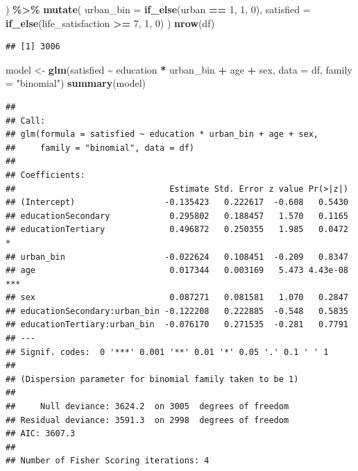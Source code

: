 \documentclass[
]{article}
\newenvironment{Shaded}{\begin{snugshade}}{\end{snugshade}}
\newcommand{\AttributeTok}[1]{\textcolor[rgb]{0.13,0.29,0.53}{#1}}
\newcommand{\DecValTok}[1]{\textcolor[rgb]{0.00,0.00,0.81}{#1}}
\newcommand{\FunctionTok}[1]{\textcolor[rgb]{0.13,0.29,0.53}{\textbf{#1}}}
\newcommand{\NormalTok}[1]{#1}
\newcommand{\OtherTok}[1]{\textcolor[rgb]{0.56,0.35,0.01}{#1}}
\newcommand{\SpecialCharTok}[1]{\textcolor[rgb]{0.81,0.36,0.00}{\textbf{#1}}}
\newcommand{\StringTok}[1]{\textcolor[rgb]{0.31,0.60,0.02}{#1}}
\begin{document}
\begin{Shaded}
\begin{Highlighting}[]
\NormalTok{  ) }\SpecialCharTok{\%\textgreater{}\%}
  \FunctionTok{mutate}\NormalTok{(}
    \AttributeTok{urban\_bin =} \FunctionTok{if\_else}\NormalTok{(urban }\SpecialCharTok{==} \DecValTok{1}\NormalTok{, }\DecValTok{1}\NormalTok{, }\DecValTok{0}\NormalTok{),}
    \AttributeTok{satisfied =} \FunctionTok{if\_else}\NormalTok{(life\_satisfaction }\SpecialCharTok{\textgreater{}=} \DecValTok{7}\NormalTok{, }\DecValTok{1}\NormalTok{, }\DecValTok{0}\NormalTok{)}
\NormalTok{  )}
\FunctionTok{nrow}\NormalTok{(df)}
\end{Highlighting}
\end{Shaded}

\begin{verbatim}
## [1] 3006
\end{verbatim}

\begin{Shaded}
\begin{Highlighting}[]
\NormalTok{model }\OtherTok{\textless{}{-}} \FunctionTok{glm}\NormalTok{(satisfied }\SpecialCharTok{\textasciitilde{}}\NormalTok{ education }\SpecialCharTok{*}\NormalTok{ urban\_bin }\SpecialCharTok{+}\NormalTok{ age }\SpecialCharTok{+}\NormalTok{ sex, }\AttributeTok{data =}\NormalTok{ df, }\AttributeTok{family =} \StringTok{"binomial"}\NormalTok{)}
\FunctionTok{summary}\NormalTok{(model)}
\end{Highlighting}
\end{Shaded}

\begin{verbatim}
## 
## Call:
## glm(formula = satisfied ~ education * urban_bin + age + sex, 
##     family = "binomial", data = df)
## 
## Coefficients:
##                               Estimate Std. Error z value Pr(>|z|)    
## (Intercept)                  -0.135423   0.222617  -0.608   0.5430    
## educationSecondary            0.295802   0.188457   1.570   0.1165    
## educationTertiary             0.496872   0.250355   1.985   0.0472 *  
## urban_bin                    -0.022624   0.108451  -0.209   0.8347    
## age                           0.017344   0.003169   5.473 4.43e-08 ***
## sex                           0.087271   0.081581   1.070   0.2847    
## educationSecondary:urban_bin -0.122208   0.222885  -0.548   0.5835    
## educationTertiary:urban_bin  -0.076170   0.271535  -0.281   0.7791    
## ---
## Signif. codes:  0 '***' 0.001 '**' 0.01 '*' 0.05 '.' 0.1 ' ' 1
## 
## (Dispersion parameter for binomial family taken to be 1)
## 
##     Null deviance: 3624.2  on 3005  degrees of freedom
## Residual deviance: 3591.3  on 2998  degrees of freedom
## AIC: 3607.3
## 
## Number of Fisher Scoring iterations: 4
\end{verbatim}
\end{document}
